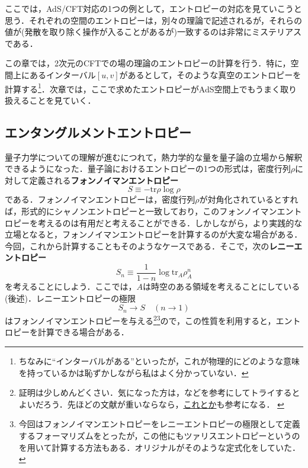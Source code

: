 \documentclass[a4paper,uplatex,dvipdfmx]{jsarticle}
\theoremstyle{definition}
\begin{document}
ここでは，AdS/CFT対応の1つの例として，エントロピーの対応を見ていこうと思う．それぞれの空間のエントロピーは，別々の理論で記述されるが，それらの値が(発散を取り除く操作が入ることがあるが)一致するのは非常にミステリアスである．

この章では，2次元のCFTでの場の理論のエントロピーの計算を行う．特に，空間上にあるインターバル$[u,v]$があるとして，そのような真空のエントロピーを計算する\footnote{
  ちなみに``インターバルがある''といったが，これが物理的にどのような意味を持っているかは恥ずかしながら私はよく分かっていない．
}．次章では，ここで求めたエントロピーがAdS空間上でもうまく取り扱えることを見ていく．

\subsection{エンタングルメントエントロピー}

量子力学についての理解が進むにつれて，熱力学的な量を量子論の立場から解釈できるようになった．量子論におけるエントロピーの1つの形式は，密度行列$\rho$に対して定義される\textbf{フォンノイマンエントロピー}
\begin{equation}
  S
  \equiv
  -\text{tr}\rho\log\rho  
\end{equation}
である．フォンノイマンエントロピーは，密度行列$\rho$が対角化されているとすれば，形式的にシャノンエントロピーと一致しており，このフォンノイマンエントロピーを考えるのは有用だと考えることができる．しかしながら，より実践的な立場となると，フォンノイマンエントロピーを計算するのが大変な場合がある．今回，これから計算することもそのようなケースである．そこで，次の\textbf{レニーエントロピー}
\begin{equation}
  S_{n}
  \equiv
  \dfrac{1}{1-n}\log\text{tr}_{A}\rho_{A}^{n}
  \label{renyi_E}
\end{equation}
を考えることにしよう．ここでは，$A$は時空のある領域を考えることにしている(後述)．レニーエントロピーの極限
\begin{equation}  
  S_{n}
  \rightarrow
  S
  \quad
  (n\rightarrow 1)
\end{equation}
はフォンノイマンエントロピーを与える\footnote{
  証明は少しめんどくさい．気になった方は，\cite{Muller-Lennert_QuantumRenyi_2013}などを参考にしてトライするとよいだろう．先ほどの文献が重いならなら，\href{https://physics.stackexchange.com/questions/73424}{これとか}も参考になる．
  \label{note_renyi}
}\footnote{
  今回はフォンノイマンエントロピーをレニーエントロピーの極限として定義するフォーマリズムをとったが，この他にもツァリスエントロピーというのを用いて計算する方法もある．オリジナルがそのような定式化をしていた．
}ので，この性質を利用すると，エントロピーを計算できる場合がある．
\end{document}

